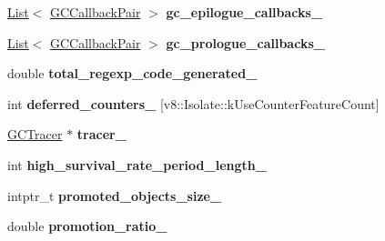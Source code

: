 \begin{DoxyCompactItemize}
\item 
\hyperlink{classv8_1_1internal_1_1_list}{List}$<$ \hyperlink{structv8_1_1internal_1_1_heap_1_1_g_c_callback_pair}{G\+C\+Callback\+Pair} $>$ {\bfseries gc\+\_\+epilogue\+\_\+callbacks\+\_\+}\hypertarget{classv8_1_1internal_1_1_heap_aba8bdff92bc1c5df24886aa72d5ad104}{}\label{classv8_1_1internal_1_1_heap_aba8bdff92bc1c5df24886aa72d5ad104}

\item 
\hyperlink{classv8_1_1internal_1_1_list}{List}$<$ \hyperlink{structv8_1_1internal_1_1_heap_1_1_g_c_callback_pair}{G\+C\+Callback\+Pair} $>$ {\bfseries gc\+\_\+prologue\+\_\+callbacks\+\_\+}\hypertarget{classv8_1_1internal_1_1_heap_acefe970df98d497bd702f1488ab45fbc}{}\label{classv8_1_1internal_1_1_heap_acefe970df98d497bd702f1488ab45fbc}

\item 
double {\bfseries total\+\_\+regexp\+\_\+code\+\_\+generated\+\_\+}\hypertarget{classv8_1_1internal_1_1_heap_a6a94569124aaa4ebffb9351b591a572e}{}\label{classv8_1_1internal_1_1_heap_a6a94569124aaa4ebffb9351b591a572e}

\item 
int {\bfseries deferred\+\_\+counters\+\_\+} \mbox{[}v8\+::\+Isolate\+::k\+Use\+Counter\+Feature\+Count\mbox{]}\hypertarget{classv8_1_1internal_1_1_heap_a2e648d6fb2d9ac2b4b76d5fdaee9d18c}{}\label{classv8_1_1internal_1_1_heap_a2e648d6fb2d9ac2b4b76d5fdaee9d18c}

\item 
\hyperlink{classv8_1_1internal_1_1_g_c_tracer}{G\+C\+Tracer} $\ast$ {\bfseries tracer\+\_\+}\hypertarget{classv8_1_1internal_1_1_heap_af471a32e5bd3f6f422c7a0d02325fd6e}{}\label{classv8_1_1internal_1_1_heap_af471a32e5bd3f6f422c7a0d02325fd6e}

\item 
int {\bfseries high\+\_\+survival\+\_\+rate\+\_\+period\+\_\+length\+\_\+}\hypertarget{classv8_1_1internal_1_1_heap_af15e44200bed8fdaf94973b8e7f613a6}{}\label{classv8_1_1internal_1_1_heap_af15e44200bed8fdaf94973b8e7f613a6}

\item 
intptr\+\_\+t {\bfseries promoted\+\_\+objects\+\_\+size\+\_\+}\hypertarget{classv8_1_1internal_1_1_heap_ae09fa82d6190c08d912fa8224e7b5d82}{}\label{classv8_1_1internal_1_1_heap_ae09fa82d6190c08d912fa8224e7b5d82}

\item 
double {\bfseries promotion\+\_\+ratio\+\_\+}\hypertarget{classv8_1_1internal_1_1_heap_aba78bd5fc5b5aad1c16637300efdf0c0}{}\label{classv8_1_1internal_1_1_heap_aba78bd5fc5b5aad1c16637300efdf0c0}


\end{DoxyCompactItemize}
